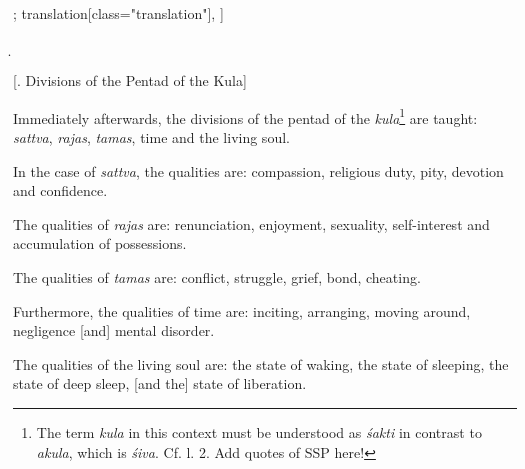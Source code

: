 \begin{alignment}[
  texts=edition[class="edition"];
  translation[class="translation"],
  ]
\begin{edition}
\begin{prose}
\dd{}
\d{}
\dd{}
\dd{}
\dd{}
\end{prose}
\end{edition}
  \begin{translation}
    \begin{tlate}
 \centerline{\textrm{\small{[. Divisions of the Pentad of the Kula]}}}
 \label{kulpentadtrans}
 \bigskip
Immediately afterwards, the divisions of the pentad of the \textit{kula}\footnote{The term \textit{kula} in this context must be understood as \textit{śakti} in contrast to \textit{akula}, which is \textit{śiva}. Cf. \pageref{knowledge} l. 2. Add quotes of SSP here!} are taught: \textit{sattva}, \textit{rajas}, \textit{tamas}, time and the living soul.

In the case of \textit{sattva}, the qualities are: compassion, religious duty, pity, devotion and confidence.

The qualities of \textit{rajas} are: renunciation, enjoyment, sexuality, self-interest and accumulation of possessions.

The qualities of \textit{tamas} are: conflict, struggle, grief, bond, cheating.

Furthermore, the qualities of time are: inciting, arranging, moving around, negligence [and] mental disorder.

The qualities of the living soul are: the state of waking, the state of sleeping, the state of deep sleep, [and the] state of liberation.


\end{tlate}
\end{translation}
\end{alignment}

